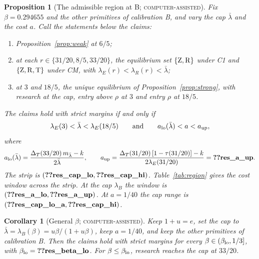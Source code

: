 \documentclass[12pt]{article}
\newtheorem{proposition}{Proposition}
\newtheorem{corollary}{Corollary}
\theoremstyle{definition}
\theoremstyle{remark}
\newcommand{\DT}{\Delta_T}
\newcommand{\lb}{\bar\lambda}
\newcommand{\st}[1]{\textsc{#1}}
\begin{document}
\begin{proposition}[The admissible region at B; \st{computer-assisted}]\label{prop:region}
Fix $\beta=0.294655$ and the other primitives of calibration B, and vary the cap $\lb$ and the cost $a$. Call the
statements below \emph{the claims}:
\begin{enumerate}[label=(\roman*),nosep]
\item Proposition~\ref{prop:weak} at $6/5$;
\item at each $r\in\{31/20,8/5,33/20\}$, the equilibrium set $\{{\rm Z},{\rm R}\}$ under C1 and
  $\{{\rm Z},{\rm R},{\rm T}\}$ under CM, with $\lambda_E(r)<\lambda_R(r)<\lb$;
\item at $3$ and $18/5$, the unique equilibrium of Proposition~\ref{prop:strong}, with research at the cap, entry
  above $\rho$ at $3$ and entry $\rho$ at $18/5$.
\end{enumerate}
The claims hold with strict margins if and only if
\begin{equation}\label{eq:region}
\lambda_E(3)<\lb<\lambda_E(18/5)\qquad\text{and}\qquad a_{\rm lo}(\lb)<a<a_{\rm up},
\end{equation}
where
\[
a_{\rm lo}(\lb)=\frac{\DT(33/20)\,m_{\lb}-k}{2\lb},\qquad
a_{\rm up}=\frac{\DT(31/20)\,[1-\tau(31/20)]-k}{2\lambda_E(31/20)}=\reg{res_a_up} .
\]
The strip is $(\reg{res_cap_lo},\reg{res_cap_hi})$. Table~\ref{tab:region} gives the cost window across the strip.
At the cap $\lambda_B$ the window is $(\reg{res_a_lo},\reg{res_a_up})$. At $a=1/40$ the cap range is
$(\reg{res_cap_lo_a},\reg{res_cap_hi})$.
\end{proposition}

\begin{corollary}[General $\beta$; \st{computer-assisted}]\label{cor:beta}
Keep $1+u=e$, set the cap to $\lb=\lambda_B(\beta)=u\beta/(1+u\beta)$, keep $a=1/40$, and keep the other primitives
of calibration B. Then the claims hold with strict margins for every $\beta\in(\beta_{\rm lo},1/3]$, with
$\beta_{\rm lo}=\reg{res_beta_lo}$. For $\beta\le\beta_{\rm lo}$, research reaches the cap at $33/20$.
\end{corollary}
\end{document}
